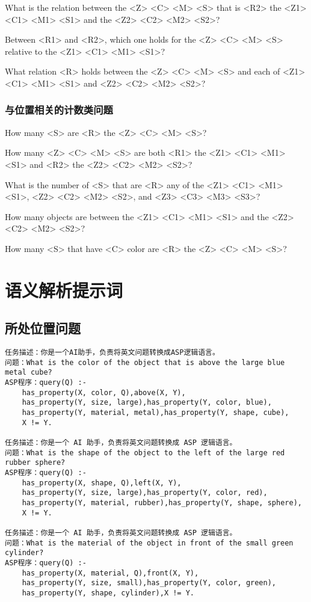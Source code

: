 What is the relation between the <Z> <C> <M> <S> that is <R2> the <Z1> <C1> <M1> <S1> and the <Z2> <C2> <M2> <S2>?

Between <R1> and <R2>, which one holds for the <Z> <C> <M> <S> relative to the <Z1> <C1> <M1> <S1>?

What relation <R> holds between the <Z> <C> <M> <S> and each of <Z1> <C1> <M1> <S1> and <Z2> <C2> <M2> <S2>?
\subsubsection{与位置相关的计数类问题}
How many <S> are <R> the <Z> <C> <M> <S>?

How many <Z> <C> <M> <S> are both <R1> the <Z1> <C1> <M1> <S1> and <R2> the <Z2> <C2> <M2> <S2>?

What is the number of <S> that are <R> any of the <Z1> <C1> <M1> <S1>, <Z2> <C2> <M2> <S2>, and <Z3> <C3> <M3> <S3>?

How many objects are between the <Z1> <C1> <M1> <S1> and the <Z2> <C2> <M2> <S2>?

How many <S> that have <C> color are <R> the <Z> <C> <M> <S>?
\section{语义解析提示词}
\label{appendix:semantics-parsing-prompts}
\subsection{所处位置问题}
\begin{lstlisting}
任务描述：你是一个AI助手，负责将英文问题转换成ASP逻辑语言。
问题：What is the color of the object that is above the large blue metal cube?
ASP程序：query(Q) :-
    has_property(X, color, Q),above(X, Y),
    has_property(Y, size, large),has_property(Y, color, blue),
    has_property(Y, material, metal),has_property(Y, shape, cube),
    X != Y.

任务描述：你是一个 AI 助手，负责将英文问题转换成 ASP 逻辑语言。
问题：What is the shape of the object to the left of the large red rubber sphere?
ASP程序：query(Q) :-
    has_property(X, shape, Q),left(X, Y),
    has_property(Y, size, large),has_property(Y, color, red),
    has_property(Y, material, rubber),has_property(Y, shape, sphere),
    X != Y.

任务描述：你是一个 AI 助手，负责将英文问题转换成 ASP 逻辑语言。
问题：What is the material of the object in front of the small green cylinder?
ASP程序：query(Q) :-
    has_property(X, material, Q),front(X, Y),
    has_property(Y, size, small),has_property(Y, color, green),
    has_property(Y, shape, cylinder),X != Y.
\end{lstlisting}
